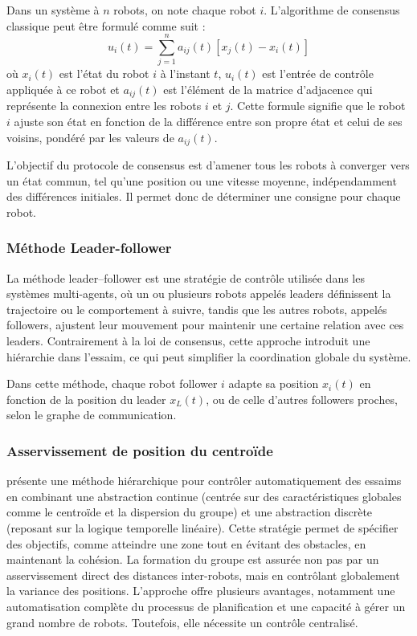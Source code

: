 \noindent Dans un système à $n$ robots, on note chaque robot $i$. L'algorithme de consensus classique peut être formulé comme suit :
\begin{equation}
u_i(t) = \sum_{j=1}^{n} a_{ij}(t) [x_j(t) - x_i(t)]
\end{equation}
où $x_i(t)$ est l'état du robot $i$ à l'instant $t$, $u_i(t)$ est l'entrée de contrôle appliquée à ce robot et $a_{ij}(t)$ est l'élément de la matrice d'adjacence qui représente la connexion entre les robots $i$ et $j$. Cette formule signifie que le robot $i$ ajuste son état en fonction de la différence entre son propre état et celui de ses voisins, pondéré par les valeurs de $a_{ij}(t)$.

L'objectif du protocole de consensus est d'amener tous les robots à converger vers un état commun, tel qu'une position ou une vitesse moyenne, indépendamment des différences initiales. Il permet donc de déterminer une consigne pour chaque robot.

\subsubsection*{Méthode Leader-follower}

La méthode leader–follower \cite{loria_leaderfollower_2016, yang_adaptive_2021} est une stratégie de contrôle utilisée dans les systèmes multi-agents, où un ou plusieurs robots appelés leaders définissent la trajectoire ou le comportement à suivre, tandis que les autres robots, appelés followers, ajustent leur mouvement pour maintenir une certaine relation avec ces leaders. Contrairement à la loi de consensus, cette approche introduit une hiérarchie dans l’essaim, ce qui peut simplifier la coordination globale du système.

Dans cette méthode, chaque robot follower $i$ adapte sa position $x_i(t)$ en fonction de la position du leader $x_L(t)$, ou de celle d'autres followers proches, selon le graphe de communication.

\subsubsection*{Asservissement de position du centroïde}

\cite{kloetzer_temporal_2007} présente une méthode hiérarchique pour contrôler automatiquement des essaims en combinant une abstraction continue (centrée sur des caractéristiques globales comme le centroïde et la dispersion du groupe) et une abstraction discrète (reposant sur la logique temporelle linéaire). Cette stratégie permet de spécifier des objectifs, comme atteindre une zone tout en évitant des obstacles, en maintenant la cohésion. La formation du groupe est assurée non pas par un asservissement direct des distances inter-robots, mais en contrôlant globalement la variance des positions. L’approche offre plusieurs avantages, notamment une automatisation complète du processus de planification et une capacité à gérer un grand nombre de robots. Toutefois, elle nécessite un contrôle centralisé.


